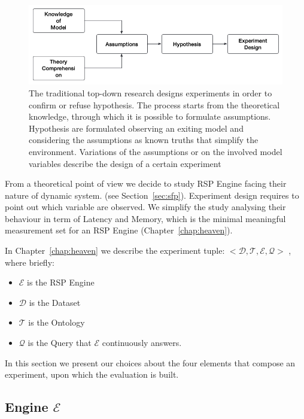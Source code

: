\begin{figure}[tbh]
  \centering
	\includegraphics[width=\linewidth]{images/experiment-design}
	\caption[Experiment Design Process]{The traditional top-down research designs experiments in order to confirm or refuse hypothesis. The process starts from the theoretical knowledge, through which it is possible to formulate assumptions. Hypothesis are formulated observing an exiting model and considering the assumptions as known truths that simplify the environment. Variations of the assumptions or on the involved model variables describe the design of a certain experiment}
  	\label{fig:experiment-design}
\end{figure}

From a theoretical point of view we decide to study RSP Engine facing their nature of dynamic system. (see Section~\ref{sec:sfp}). Experiment design requires to point out which variable are observed. We simplify the study analysing their behaviour in term of Latency and Memory, which is the minimal meaningful measurement set for an RSP Engine (Chapter~\ref{chap:heaven}).

In Chapter~\ref{chap:heaven} we describe the experiment tuple: $<\mathcal{D}, \mathcal{T},\mathcal{E}, \mathcal{Q}>$ , where briefly:
\begin{itemize}
\item $\mathcal{E}$ is the RSP Engine
\item $\mathcal{D}$ is the Dataset 
\item $\mathcal{T}$ is the Ontology
\item $\mathcal{Q}$ is the Query that $\mathcal{E}$ continuously answers.
\end{itemize}

In this section we present our choices about the four elements that compose an experiment, upon which the evaluation is built.

\pagebreak

\subsection{Engine $\mathcal{E}$}

